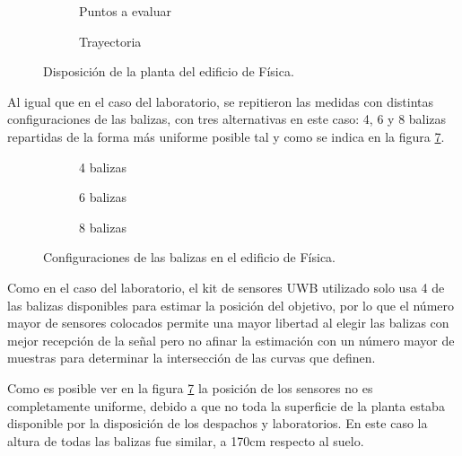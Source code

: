 \begin{figure}[H]
  \begin{subfigure}[b]{.5\textwidth}
    \centering
    \def\svgwidth{0.75\linewidth}
     
    \caption{Puntos a evaluar}
    \label{fig:puntos_fisica}
  \end{subfigure}
  \begin{subfigure}[b]{.5\textwidth}
    \centering
    \def\svgwidth{0.75\linewidth}
     
    \caption{Trayectoria}
    \label{fig:trayecto_fisica}
  \end{subfigure}
  \caption{Disposición de la planta del edificio de Física.}
  \label{fig:fisica}
\end{figure}

Al igual que en el caso del laboratorio, se repitieron las medidas con distintas configuraciones de las balizas, con tres alternativas en este caso: 4, 6 y 8 balizas repartidas de la forma más uniforme posible tal y como se indica en la figura \ref{fig:sensores_fisica}.

\begin{figure}[H]
  \begin{subfigure}[b]{.3\textwidth}
    \centering
    \def\svgwidth{0.9\linewidth}
     
    \caption{4 balizas}
    \label{fig:sensores_fisica_4}
  \end{subfigure}
  \begin{subfigure}[b]{.3\textwidth}
    \centering
    \def\svgwidth{0.9\linewidth}
      
    \caption{6 balizas}
    \label{fig:sensores_fisica_6}
  \end{subfigure}
  \begin{subfigure}[b]{.3\textwidth}
    \centering
    \def\svgwidth{0.9\linewidth}
      
    \caption{8 balizas}
    \label{fig:sensores_fisica_8}
  \end{subfigure}
  \caption{Configuraciones de las balizas en el edificio de Física.}
  \label{fig:sensores_fisica}
\end{figure}

Como en el caso del laboratorio, el kit de sensores UWB utilizado solo usa 4 de las balizas disponibles para estimar la posición del objetivo, por lo que el número mayor de sensores colocados permite una mayor libertad al elegir las balizas con mejor recepción de la señal pero no afinar la estimación con un número mayor de muestras para determinar la intersección de las curvas que definen.

Como es posible ver en la figura \ref{fig:sensores_fisica} la posición de los sensores no es completamente uniforme, debido a que no toda la superficie de la planta estaba disponible por la disposición de los despachos y laboratorios.
En este caso la altura de todas las balizas fue similar, a 170cm respecto al suelo.